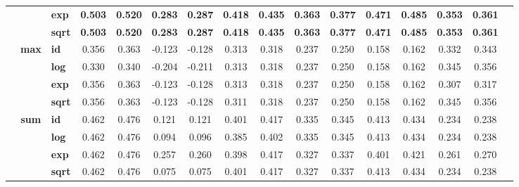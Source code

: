 \begin{table}[t]
{\begin{tabular}{cclccccccccccccc}
              & & \textbf{exp}  & \textbf{0.503} & \textbf{0.520} & \textbf{0.283} & \textbf{0.287} & \textbf{0.418} & \textbf{0.435} & \textbf{0.363} & \textbf{0.377} & \textbf{0.471} & \textbf{0.485} & \textbf{0.353} & \textbf{0.361} \\
              & & \textbf{sqrt} & \textbf{0.503} & \textbf{0.520} & \textbf{0.283} & \textbf{0.287} & \textbf{0.418} & \textbf{0.435} & \textbf{0.363} & \textbf{0.377} & \textbf{0.471} & \textbf{0.485} & \textbf{0.353} & \textbf{0.361} \\
      \cmidrule{2-15}
      & \multirow{4}{*}{\textbf{max}}
                & \textbf{id}   & 0.356 & 0.363 & -0.123 & -0.128 & 0.313 & 0.318 & 0.237 & 0.250 & 0.158 & 0.162 & 0.332 & 0.343 \\
              & & \textbf{log}  & 0.330 & 0.340 & -0.204 & -0.211 & 0.313 & 0.318 & 0.237 & 0.250 & 0.158 & 0.162 & 0.345 & 0.356 \\
              & & \textbf{exp}  & 0.356 & 0.363 & -0.123 & -0.128 & 0.313 & 0.318 & 0.237 & 0.250 & 0.158 & 0.162 & 0.307 & 0.317 \\
              & & \textbf{sqrt} & 0.356 & 0.363 & -0.123 & -0.128 & 0.311 & 0.318 & 0.237 & 0.250 & 0.158 & 0.162 & 0.345 & 0.356 \\
      \cmidrule{2-15}
      & \multirow{4}{*}{\textbf{sum}}
                & \textbf{id}   & 0.462 & 0.476 & 0.121 & 0.121 & 0.401 & 0.417 & 0.335 & 0.345 & 0.413 & 0.434 & 0.234 & 0.238 \\
              & & \textbf{log}  & 0.462 & 0.476 & 0.094 & 0.096 & 0.385 & 0.402 & 0.335 & 0.345 & 0.413 & 0.434 & 0.234 & 0.238 \\
              & & \textbf{exp}  & 0.462 & 0.476 & 0.257 & 0.260 & 0.398 & 0.417 & 0.327 & 0.337 & 0.401 & 0.421 & 0.261 & 0.270 \\
              & & \textbf{sqrt} & 0.462 & 0.476 & 0.075 & 0.075 & 0.401 & 0.417 & 0.327 & 0.337 & 0.413 & 0.434 & 0.234 & 0.238 \\
      \midrule


\end{tabular}}
\end{table}
